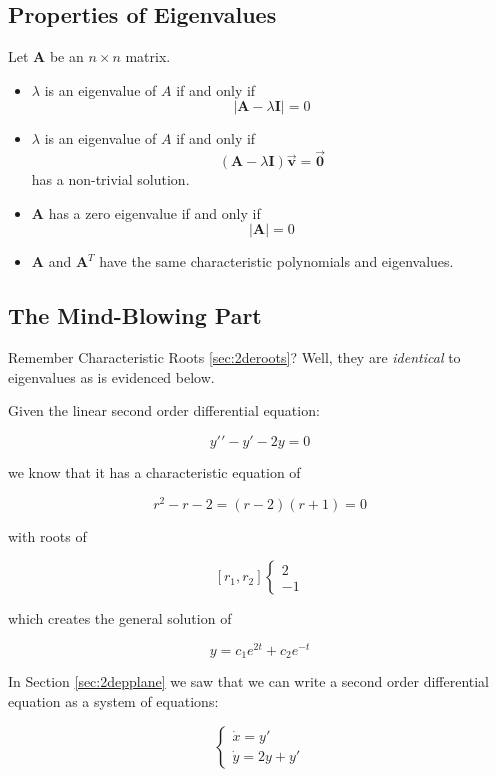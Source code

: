 \documentclass[12pt, landscape, twocolumn]{article}
\newcommand{\ma}[0]{\mathbf{A} }        %
\let\oldvec\vec
\renewcommand{\vec}[1]{\oldvec{\mathbf{ #1 } } }                    %
\begin{document}
    \subsection{Properties of Eigenvalues}
    Let $\ma$ be an $n \times n$ matrix.

        \begin{itemize}
            \item $\lambda$ is an eigenvalue of $A$ if and only if
                \[ | \ma - \lambda \mathbf{I} | = 0 \]
            \item $\lambda$ is an eigenvalue of $A$ if and only if
                \[ ( \ma - \lambda \mathbf{I}) \vec{v} = \vec{0} \]
                has a non-trivial solution.
            \item $\ma$ has a zero eigenvalue if and only if
                \[ | \ma | = 0 \]
            \item $\ma$ and $\ma^T$ have the same characteristic polynomials and eigenvalues.
        \end{itemize}

    \subsection{The Mind-Blowing Part}
    Remember Characteristic Roots \eqref{sec:2deroots}? Well, they are \textit{identical} to eigenvalues as is evidenced below.

     Given the linear second order differential equation:

        \[ y\prime\prime - y \prime - 2y = 0 \]

    we know that it has a characteristic equation of

        \[ r^2 - r - 2 = (r - 2)(r + 1) = 0 \]

    with roots of

        \[
            [r_1, r_2]
            \begin{cases}
                2\\
                -1
            \end{cases}
        \]

    which creates the general solution of

        \[ y = c_1 e^{2t} + c_2 e^{-t} \]

    In Section \ref{sec:2depplane} we saw that we can write a second order differential equation as a system of equations:

        \[ \begin{cases}
            \dot{x} = y\prime\\
            \dot{y} = 2y + y\prime
        \end{cases} \]
\end{document}
